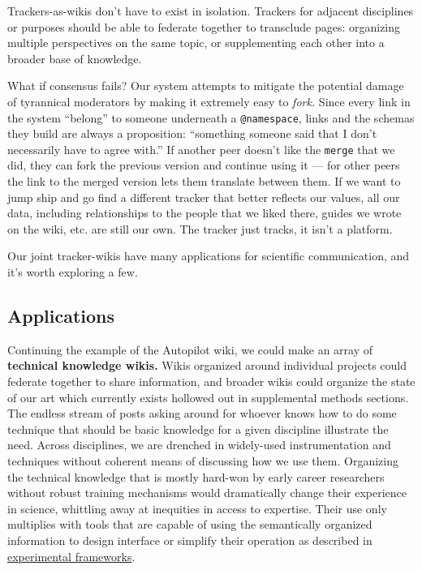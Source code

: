 Trackers-as-wikis don't have to exist in isolation. Trackers for
adjacent disciplines or purposes should be able to federate together to
transclude pages: organizing multiple perspectives on the same topic, or
supplementing each other into a broader base of knowledge.

What if consensus fails? Our system attempts to mitigate the potential
damage of tyrannical moderators by making it extremely easy to
\emph{fork.} Since every link in the system ``belong'' to someone
underneath a \texttt{@namespace}, links and the schemas they build are
always a proposition: ``something someone said that I don't necessarily
have to agree with.'' If another peer doesn't like the \texttt{merge}
that we did, they can fork the previous version and continue using it
--- for other peers the link to the merged version lets them translate
between them. If we want to jump ship and go find a different tracker
that better reflects our values, all our data, including relationships
to the people that we liked there, guides we wrote on the wiki, etc. are
still our own. The tracker just tracks, it isn't a platform.

Our joint tracker-wikis have many applications for scientific
communication, and it's worth exploring a few.

\hypertarget{applications}{%
\subsection{Applications}\label{applications}}

Continuing the example of the Autopilot wiki, we could make an array of
\textbf{technical knowledge wikis.} Wikis organized around individual
projects could federate together to share information, and broader wikis
could organize the state of our art which currently exists hollowed out
in supplemental methods sections. The endless stream of posts asking
around for whoever knows how to do some technique that should be basic
knowledge for a given discipline illustrate the need. Across
disciplines, we are drenched in widely-used instrumentation and
techniques without coherent means of discussing how we use them.
Organizing the technical knowledge that is mostly hard-won by early
career researchers without robust training mechanisms would dramatically
change their experience in science, whittling away at inequities in
access to expertise. Their use only multiplies with tools that are
capable of using the semantically organized information to design
interface or simplify their operation as described in
\protect\hyperlink{experimental-frameworks}{experimental frameworks}.

